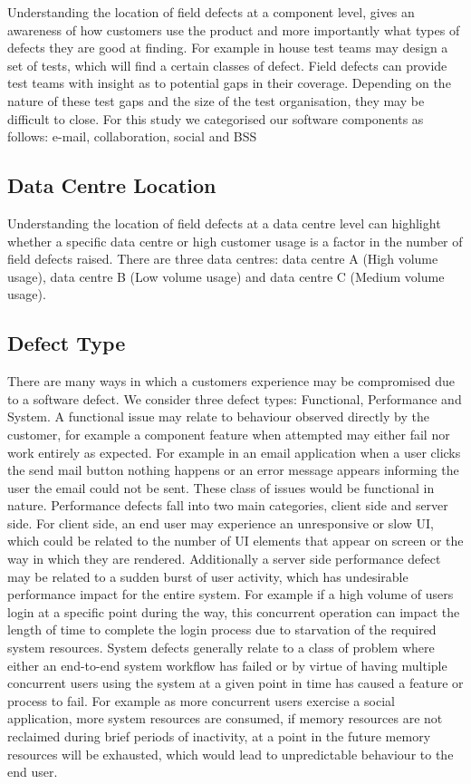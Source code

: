 \documentclass[conference]{IEEEtran}
\begin{document}
Understanding the location of field defects at a component level, gives an awareness of how customers use the product and more importantly what types of defects they are good at finding. For example in house test teams may design a set of tests, which will find a certain classes of defect. Field defects can provide test teams with insight as to potential gaps in their coverage. Depending on the nature of these test gaps and the size of the test organisation, they may be difficult to close. For this study we categorised our software components as follows: e-mail, collaboration, social and BSS

\subsection{Data Centre Location}

Understanding the location of field defects at a data centre level can highlight whether a specific data centre or high customer usage is a factor in the number of field defects raised. There are three data centres: data centre A (High volume usage), data centre B (Low volume usage) and data centre C (Medium volume usage).

\subsection{Defect Type}

There are many ways in which a customers experience may be compromised due to a software defect. We consider three defect types: Functional, Performance and System.
A functional issue may relate to behaviour observed directly by the customer, for example a component feature when attempted may either fail nor work entirely as expected.  For example in an email application when a user clicks the send mail button nothing happens or an error message appears informing the user the email could not be sent. These class of issues would be functional in nature.
Performance defects fall into two main categories, client side and server side. For client side, an end user may experience an unresponsive or slow UI, which could be related to the number of UI elements that appear on screen or the way in which they are rendered. Additionally a server side performance defect may be related to a sudden burst of user activity, which has undesirable performance impact for the entire system. For example if a high volume of users login at a specific point during the way, this concurrent operation can impact the length of time to complete the login process due to starvation of the required system resources.
System defects generally relate to a class of problem where either an end-to-end system workflow has failed or by virtue of having multiple concurrent users using the system at a given point in time has caused a feature or process to fail.  For example as more concurrent users exercise a social application, more system resources are consumed, if memory resources are not reclaimed during brief periods of inactivity, at a point in the future memory resources will be exhausted, which would lead to unpredictable behaviour to the end user. 
\end{document}

